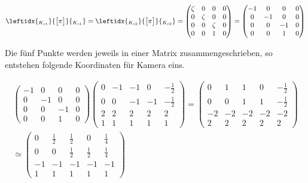 \begin{gather}
	\leftidx{_{K_{c1}}}{\begin{bmatrix}
			\pi
	\end{bmatrix}}{_{K_{c1}}}
	=		\leftidx{_{K_{c2}}}{\begin{bmatrix}
			\pi
	\end{bmatrix}}{_{K_{c2}}}
	=
	\begin{pmatrix}
		\zeta&0&0&0\\
		0&\zeta&0&0\\
		0&0&\zeta&0\\
		0&0&1&0
	\end{pmatrix}=
	\begin{pmatrix}
		-1&0&0&0\\
		0&-1&0&0\\
		0&0&-1&0\\
		0&0&1&0
	\end{pmatrix}
\end{gather}

Die fünf Punkte werden jeweils in einer Matrix zusammengeschrieben, so entstehen folgende Koordinaten für Kamera eins.

\begin{gather}
	\begin{pmatrix}
		-1&0&0&0\\
		0&-1&0&0\\
		0&0&-1&0\\
		0&0&1&0
	\end{pmatrix}
	\begin{pmatrix}
		0&-1&-1&0&-\frac{1}{2}\\
		0&0&-1&-1&-\frac{1}{2}\\
		2&2&2&2&2\\
		1&1&1&1&1
	\end{pmatrix}=
	\begin{pmatrix}
		0&1&1&0&-\frac{1}{2}\\
		0&0&1&1&-\frac{1}{2}\\
		-2&-2&-2&-2&-2\\
		2&2&2&2&2
	\end{pmatrix}\\
	\simeq
	\begin{pmatrix}
		0&\frac{1}{2}&\frac{1}{2}&0&\frac{1}{4}\\
		0&0&\frac{1}{2}&\frac{1}{2}&\frac{1}{4}\\
		-1&-1&-1&-1&-1\\
		1&1&1&1&1
	\end{pmatrix}
\end{gather}
\pagebreak

